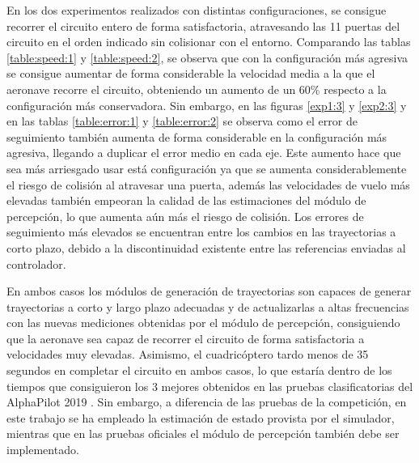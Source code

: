 En los dos experimentos realizados con distintas configuraciones, se consigue recorrer el circuito entero de forma satisfactoria, atravesando las 11 puertas del circuito en el orden indicado sin colisionar con el entorno. Comparando las tablas \ref{table:speed:1} y \ref{table:speed:2}, se observa que con la configuración más agresiva se consigue aumentar de forma considerable la velocidad media a la que el aeronave recorre el circuito, obteniendo un aumento de un 60\% respecto a la configuración más conservadora. Sin embargo, en las figuras \ref{exp1:3} y \ref{exp2:3}  y en las tablas \ref{table:error:1} y \ref{table:error:2} se observa como el error de seguimiento también aumenta de forma considerable en la configuración más agresiva, llegando a duplicar el error medio en cada eje. Este aumento hace que sea más arriesgado usar está configuración ya que se aumenta considerablemente el riesgo de colisión al atravesar una puerta, además las velocidades de vuelo más elevadas también empeoran la calidad de las estimaciones del módulo de percepción, lo que aumenta aún más el riesgo de colisión. Los errores de seguimiento más elevados se encuentran entre los cambios en las trayectorias a corto plazo, debido a la discontinuidad existente entre las referencias enviadas al controlador.

En ambos casos los módulos de generación de trayectorias son capaces de generar trayectorias a corto y largo plazo adecuadas y de actualizarlas a altas frecuencias con las nuevas mediciones obtenidas por el módulo de percepción, consiguiendo que la aeronave sea capaz de recorrer el circuito de forma satisfactoria a velocidades muy elevadas.
Asimismo, el cuadricóptero tardo menos de 35 segundos en completar el circuito en ambos casos, lo que estaría dentro de los tiempos que consiguieron los 3 mejores obtenidos en las pruebas clasificatorias del AlphaPilot 2019 \cite{guerra2019flightgoggles}. Sin embargo, a diferencia de las pruebas de la competición, en este trabajo se ha empleado la estimación de estado provista por el simulador, mientras que en las pruebas oficiales el módulo de percepción también debe ser implementado. 





